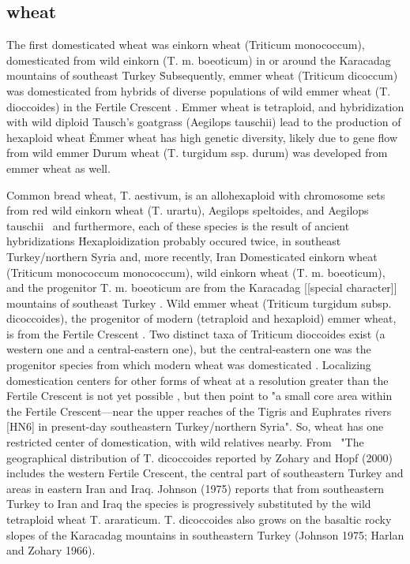 \documentclass[11pt]{article}
\begin{document}
\subsection*{wheat}

The first domesticated wheat was einkorn wheat (Triticum monococcum), domesticated from wild einkorn (T. m. boeoticum) in or around the Karacadag mountains of southeast Turkey \cite{heun1997site, harlan1966distribution, ozkan2002aflp}\.
Subsequently, emmer wheat (Triticum dicoccum) was domesticated from hybrids of diverse populations of wild emmer wheat (T. dioccoides) in the Fertile Crescent \cite{lev2000cradle, civavn2013reticulated, luo2007structure}.
Emmer wheat is tetraploid, and hybridization with wild diploid Tausch's goatgrass (Aegilops tauschii) lead to the production of hexaploid wheat \cite{salamini2002genetics, hancock2012plant, dvorak2006molecular}\.
Emmer wheat has high genetic diversity, likely due to gene flow from wild emmer \cite{luo2007structure, dvorak2006molecular}\.

Durum wheat (T. turgidum ssp. durum) was developed from emmer wheat as well.

Common bread wheat, T. aestivum, is an allohexaploid with chromosome sets from red wild einkorn wheat (T. urartu), Aegilops speltoides, and Aegilops tauschii \cite{mcfadden1946origin, petersen2006phylogenetic}\, and furthermore, each of these species is the result of ancient hybridizations \cite{marcussen2014ancient}\.
Hexaploidization probably occured twice, in southeast Turkey/northern Syria and, more recently, Iran \cite{giles2006gludy}\.

Domesticated einkorn wheat (Triticum monococcum monococcum), wild einkorn wheat (T. m. boeoticum), and the progenitor T. m. boeoticum are from the Karacadag [[special character]] mountains of southeast Turkey \cite{heun1997site}.
Wild emmer wheat (Triticum turgidum subsp. dicoccoides), the progenitor of modern (tetraploid and hexaploid) emmer wheat, is from the Fertile Crescent \cite{lev2000cradle, ozkan2002aflp}.
Two distinct taxa of Triticum dioccoides exist (a western one and a central-eastern one), but the central-eastern one was the progenitor species from which modern wheat was domesticated \cite{ozkan2005reconsideration}.
Localizing domestication centers for other forms of wheat at a resolution greater than the Fertile Crescent is not yet possible \cite{nesbitt1998wheat}, but then \cite{lev2000cradle} point to "a small core area within the Fertile Crescent—near the upper reaches of the Tigris and Euphrates rivers [HN6] in present-day southeastern Turkey/northern Syria".
So, wheat has one restricted center of domestication, with wild relatives nearby.
From \cite{ozkan2005reconsideration}\, "The geographical distribution of T. dicoccoides reported by Zohary and Hopf (2000) includes the western Fertile Crescent, the central part of southeastern Turkey and areas in eastern Iran and Iraq. Johnson (1975) reports that from southeastern Turkey to Iran and Iraq the species is progressively substituted by the wild tetraploid wheat T. araraticum. T. dicoccoides also grows on the basaltic rocky slopes of the Karacadag mountains in southeastern Turkey (Johnson 1975; Harlan and Zohary 1966).
\end{document}
